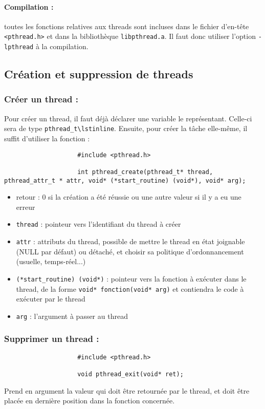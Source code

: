 		\paragraph{Compilation :} toutes les fonctions relatives aux threads sont incluses dans le fichier d'en-tête \lstinline!<pthread.h>! et dans la bibliothèque \lstinline!libpthread.a!. Il faut donc utiliser l'option \lstinline!-lpthread! à la compilation.
		
		\subsection{Création et suppression de threads}
			
			\subsubsection*{Créer un thread :}
				Pour créer un thread, il faut déjà déclarer une variable le représentant. Celle-ci sera de type \lstinline!pthread_t\lstinline!. Ensuite, pour créer la tâche elle-même, il suffit d'utiliser la fonction :
				\begin{lstlisting}
					#include <pthread.h>

					int pthread_create(pthread_t* thread, pthread_attr_t * attr, void* (*start_routine) (void*), void* arg);
				\end{lstlisting}

				\begin{itemize}
					\item retour : 0 si la création a été réussie ou une autre valeur si il y a eu une erreur
					\item \lstinline!thread! : pointeur vers l'identifiant du thread à créer
					\item \lstinline!attr! : attributs du thread, possible de mettre le thread en état joignable (NULL par défaut) ou détaché, et choisir sa politique d'ordonnancement (usuelle, temps-réel...)
					\item \lstinline!(*start_routine) (void*)! : pointeur vers la fonction à exécuter dans le thread, de la forme \lstinline!void* fonction(void* arg)! et contiendra le code à exécuter par le thread
					\item \lstinline!arg! : l'argument à passer au thread
				\end{itemize}
				
			\subsubsection*{Supprimer un thread :}
				\begin{lstlisting}
					#include <pthread.h>

					void pthread_exit(void* ret);
				\end{lstlisting}
				Prend en argument la valeur qui doit être retournée par le thread, et doit être placée en dernière position dans la fonction concernée.
				
